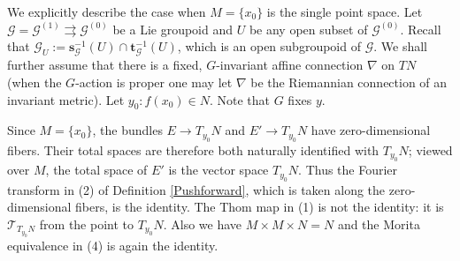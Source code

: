 \documentclass[a4paper]{amsart}
\newcommand{\maG}{\mathcal G}
\newcommand{\maT}{\mathcal T}
\newcommand{\bs}{\mathbf{s}}
\newcommand{\bt}{\mathbf{t}}
\newcommand\<{\langle}
\renewcommand\>{\rangle}
\newtheorem{lem}[theorem]{Lemma}
\newtheorem{nota}[theorem]{Notations}
\theoremstyle{definition}
\theoremstyle{remark}
\begin{document}

We explicitly describe the case when $M = \{ x _0 \}$ is the single point space.
Let $\maG = \maG ^{(1)} \rightrightarrows \maG ^{(0)}$ be a Lie groupoid and
$U $ be any open subset of $\maG ^{(0)}$.
Recall that $\maG _U := \bs ^{-1} _\maG (U) \cap \bt ^{-1} _\maG (U)$,
which is an open subgroupoid of $\maG$.
We shall further assume that there is a fixed, $G$-invariant affine connection $\nabla$ on $T N$
(when the $G$-action is proper one may let $\nabla$ be the Riemannian connection of an invariant metric).
Let $y _0 : f (x _0) \in N$.
Note that $G$ fixes $y$.

Since $M=\{x_0\}$, the bundles $E\to T_{y_0}N$ and $E'\to T_{y_0}N$ have zero-dimensional fibers.
Their total spaces are therefore both naturally identified with $T_{y_0}N$; viewed over $M$, the total space of $E'$ is the vector space $T_{y_0}N$.
Thus the Fourier transform in (2) of Definition \ref{Pushforward}, which is taken along the zero-dimensional fibers, is the identity.
The Thom map in (1) is not the identity: it is $\maT_{T_{y_0}N}$ from the point to $T_{y_0}N$.
Also we have $M \times M \times N = N$ and the Morita equivalence in (4) is again the identity.
\end{document}
